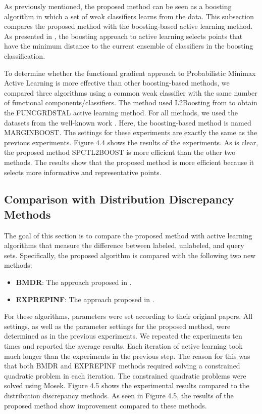 	As previously mentioned, the proposed method can be seen as a boosting algorithm in which a set of weak classifiers learns from the data. This subsection compares the proposed method with the boosting-based active learning method. As presented in \cite{schapire1997boosting}, the boosting approach to active learning selects points that have the minimum distance to the current ensemble of classifiers in the boosting classification.
	
	To determine whether the functional gradient approach to Probabilistic Minimax Active Learning is more effective than other boosting-based methods, we compared three algorithms using a common weak classifier with the same number of functional components/classifiers. The method used L2Boosting from \cite{buhlmann2003boosting} to obtain the FUNCGRDSTAL active learning method. For all methods, we used the datasets from the well-known work \cite{chang2011libsvm}. Here, the boosting-based method is named MARGINBOOST. The settings for these experiments are exactly the same as the previous experiments. Figure 4.4 shows the results of the experiments. As is clear, the proposed method SPCTL2BOOST is more efficient than the other two methods. The results show that the proposed method is more efficient because it selects more informative and representative points.
	
	\subsection{Comparison with Distribution Discrepancy Methods}
	The goal of this section is to compare the proposed method with active learning algorithms that measure the difference between labeled, unlabeled, and query sets. Specifically, the proposed algorithm is compared with the following two new methods:
	\begin{itemize}
		\item \textbf{BMDR}: The approach proposed in \cite{wang2016active}.
		\item \textbf{EXPREPINF}: The approach proposed in \cite{bissoto2015active}.
	\end{itemize}
	For these algorithms, parameters were set according to their original papers. All settings, as well as the parameter settings for the proposed method, were determined as in the previous experiments. We repeated the experiments ten times and reported the average results. Each iteration of active learning took much longer than the experiments in the previous step. The reason for this was that both BMDR and EXPREPINF methods required solving a constrained quadratic problem in each iteration. The constrained quadratic problems were solved using Mosek. Figure 4.5 shows the experimental results compared to the distribution discrepancy methods. As seen in Figure 4.5, the results of the proposed method show improvement compared to these methods.
	
